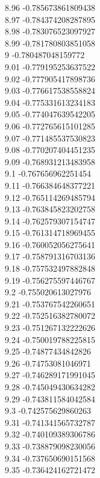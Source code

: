 {8.96	-0.785673861809438\\
8.97	-0.784374208287895\\
8.98	-0.783076523097927\\
8.99	-0.781780803851058\\
9	-0.780487048159772\\
9.01	-0.779195253637522\\
9.02	-0.777905417898736\\
9.03	-0.776617538558824\\
9.04	-0.775331613234183\\
9.05	-0.774047639542205\\
9.06	-0.772765615101285\\
9.07	-0.771485537530823\\
9.08	-0.770207404451235\\
9.09	-0.768931213483958\\
9.1	-0.767656962251454\\
9.11	-0.766384648377221\\
9.12	-0.765114269485794\\
9.13	-0.763845823202758\\
9.14	-0.762579307154747\\
9.15	-0.761314718969455\\
9.16	-0.760052056275641\\
9.17	-0.758791316703136\\
9.18	-0.757532497882848\\
9.19	-0.756275597446767\\
9.2	-0.755020613027976\\
9.21	-0.753767542260651\\
9.22	-0.752516382780072\\
9.23	-0.751267132222626\\
9.24	-0.750019788225815\\
9.25	-0.74877434842826\\
9.26	-0.74753081046971\\
9.27	-0.746289171991045\\
9.28	-0.745049430634282\\
9.29	-0.743811584042584\\
9.3	-0.742575629860263\\
9.31	-0.741341565732787\\
9.32	-0.740109389306786\\
9.33	-0.738879098230056\\
9.34	-0.737650690151568\\
9.35	-0.736424162721472\\
}
